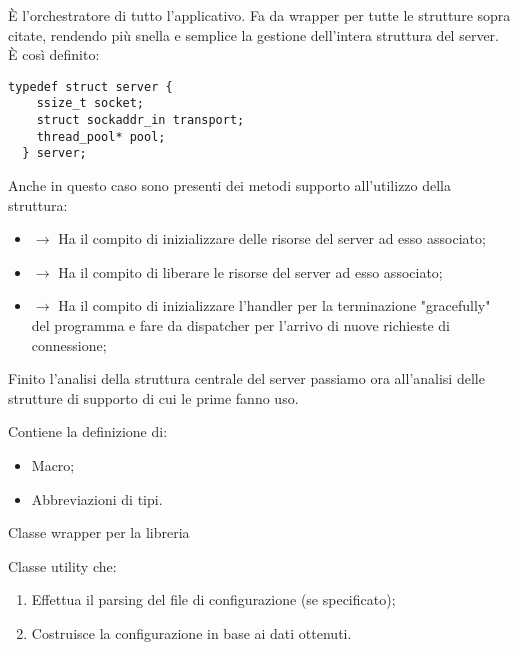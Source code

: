   \begin{center}  \end{center}
  È l'orchestratore di tutto l'applicativo. Fa da wrapper per tutte le strutture sopra citate, rendendo più snella e semplice la gestione dell'intera struttura del server. È così definito:

  \begin{lstlisting}[language={[POSIX]C}, style=wnumbers]
  typedef struct server {
    ssize_t socket;
    struct sockaddr_in transport;
    thread_pool* pool;
  } server;
  \end{lstlisting}

  Anche in questo caso sono presenti dei metodi supporto all'utilizzo della struttura:

  \begin{itemize}
    \item {} $\rightarrow$ Ha il compito di inizializzare delle risorse del server ad esso associato;
    \item {} $\rightarrow$ Ha il compito di liberare le risorse del server ad esso associato;
    \item {} $\rightarrow$ Ha il compito di inizializzare l'handler per la terminazione "gracefully" del programma e fare da dispatcher per l'arrivo di nuove richieste di connessione;
  \end{itemize}

  Finito l'analisi della struttura centrale del server passiamo ora all'analisi delle strutture di supporto di cui le prime fanno uso.

  \begin{center}  \end{center}
  Contiene la definizione di:
  \begin{itemize}
    \item Macro;
    \item Abbreviazioni di tipi.
  \end{itemize}

  \begin{center}  \end{center}
  Classe wrapper per la libreria 

  \begin{center}  \end{center}
  Classe utility che:

  \begin{enumerate}
    \item Effettua il parsing del file di configurazione (se specificato);
    \item Costruisce la configurazione in base ai dati ottenuti.
  \end{enumerate}

